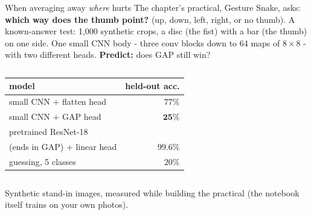 \documentclass[aspectratio=169]{beamer}
\begin{document}
\begin{frame}{When averaging away \emph{where} hurts}
  \small
  The chapter's practical, Gesture Snake, asks: \textbf{which way does the thumb point?}
  (up, down, left, right, or no thumb). A known-answer test: 1{,}000 synthetic crops, a disc
  (the fist) with a bar (the thumb) on one side. One small CNN body - three conv blocks down to
  64 maps of $8\times8$ - with two different heads. \textbf{Predict:} does GAP still win?
  \pause
  \vskip 4pt
  \begin{columns}[T]
    \begin{center}\footnotesize
      \begin{tabular}{l r}
        \textbf{model} & \textbf{held-out acc.}\\
        \hline
        small CNN $+$ flatten head & $77\%$\\
        small CNN $+$ GAP head & $\mathbf{25\%}$\\
        pretrained ResNet-18 & \\
        \quad (ends in GAP) $+$ linear head & $99.6\%$\\
        \hline
        guessing, 5 classes & $20\%$\\
      \end{tabular}
    \end{center}
  \end{columns}
  \vskip 4pt
  \vskip 2pt
  {\scriptsize\color{gray} Synthetic stand-in images, measured while building the practical
  (the notebook itself trains on your own photos).}
\end{frame}
\end{document}
